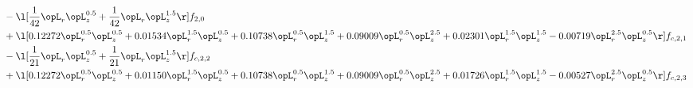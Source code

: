 \begin{alignat}{2}
& - \l[ \frac{1}{42} \opL_r \opL_z^{0.5} + \frac{1}{42} \opL_r \opL_z^{1.5}  \r] f_{2,0} \nonumber \\ 
& + \l[  0.12272 \opL_r^{0.5} \opL_z^{0.5} +  0.01534 \opL_r^{1.5} \opL_z^{0.5} +  0.10738 \opL_r^{0.5} \opL_z^{1.5} +  0.09009 \opL_r^{0.5} \opL_z^{2.5} +  0.02301 \opL_r^{1.5} \opL_z^{1.5}   -0.00719 \opL_r^{2.5} \opL_z^{0.5}  \r] f_{c,2,1} \nonumber \\ 
& - \l[ \frac{1}{21} \opL_r \opL_z^{0.5} + \frac{1}{21} \opL_r \opL_z^{1.5}  \r] f_{c,2,2} \nonumber \\ 
& + \l[  0.12272 \opL_r^{0.5} \opL_z^{0.5} +  0.01150 \opL_r^{1.5} \opL_z^{0.5} +  0.10738 \opL_r^{0.5} \opL_z^{1.5} +  0.09009 \opL_r^{0.5} \opL_z^{2.5} +  0.01726 \opL_r^{1.5} \opL_z^{1.5}   -0.00527 \opL_r^{2.5} \opL_z^{0.5}  \r] f_{c,2,3} \nonumber \\ 
\end{alignat} 


